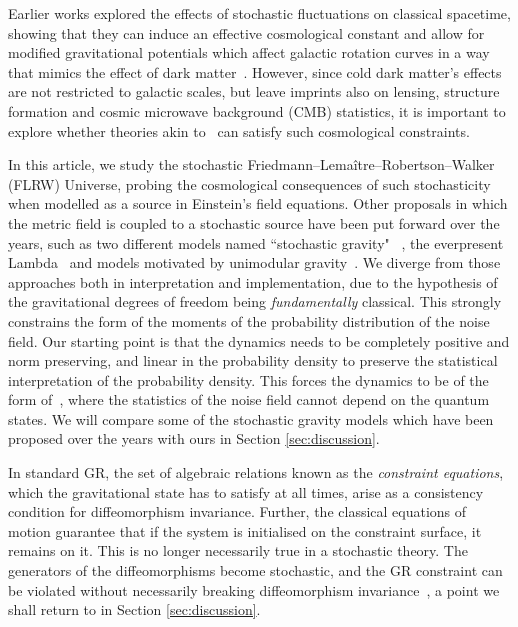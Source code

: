 \documentclass[amsmath,amssymb,11pt]{article}
\begin{document}
Earlier works explored the effects of stochastic fluctuations on classical spacetime, showing that they can induce an effective cosmological constant and allow for modified gravitational potentials which affect galactic rotation curves in a way that mimics the effect of dark matter~\cite{oppenheim2024anomalous}. However, since cold dark matter's effects are not restricted to galactic scales, but leave imprints also on lensing, structure formation and cosmic microwave background (CMB) statistics, it is important to explore whether theories akin to~\cite{oppenheim2021postquantum,oppenheim2023covariant} can satisfy such cosmological constraints.

In this article, we study the stochastic Friedmann–Lema\^itre–Robertson–Walker (FLRW) Universe, probing the cosmological consequences of such stochasticity when modelled as a source in Einstein's field equations. Other proposals in which the metric field is coupled to a stochastic source have been put forward over the years, such as two different models named “stochastic gravity" ~\cite{hu2008stochastic,moffat1997stochastic}, the everpresent Lambda~\cite{ahmed2004everpresent} and models motivated by unimodular gravity~\cite{perez2021resolving,landau2022cosmological}. We diverge from those approaches both in interpretation and implementation, due to the hypothesis of the gravitational degrees of freedom being \textit{fundamentally} classical. This  strongly constrains the form of the moments of the probability distribution of the noise field. Our starting point is that the dynamics needs to be completely positive and norm preserving, and linear in the probability density to preserve the statistical interpretation of the probability density. This forces the dynamics to be of the form of~\cite{oppenheim2021postquantum,oppenheim2022classes}, where the statistics of the noise field cannot depend on the quantum states. We will compare some of the stochastic gravity models which have been proposed over the years with ours in Section \ref{sec:discussion}.

In standard GR, the set of algebraic relations known as the \textit{constraint equations}, which the gravitational state has to satisfy at all times, arise as a consistency condition for diffeomorphism invariance. Further, the classical equations of motion guarantee that if the system is initialised on the constraint surface, it remains on it. This is no longer necessarily true in a stochastic theory. The generators of the diffeomorphisms become stochastic, and the GR constraint can be violated without necessarily breaking diffeomorphism invariance~\cite{oppenheim2022constraints}, a point we shall return to in Section \ref{sec:discussion}. 
\end{document}
